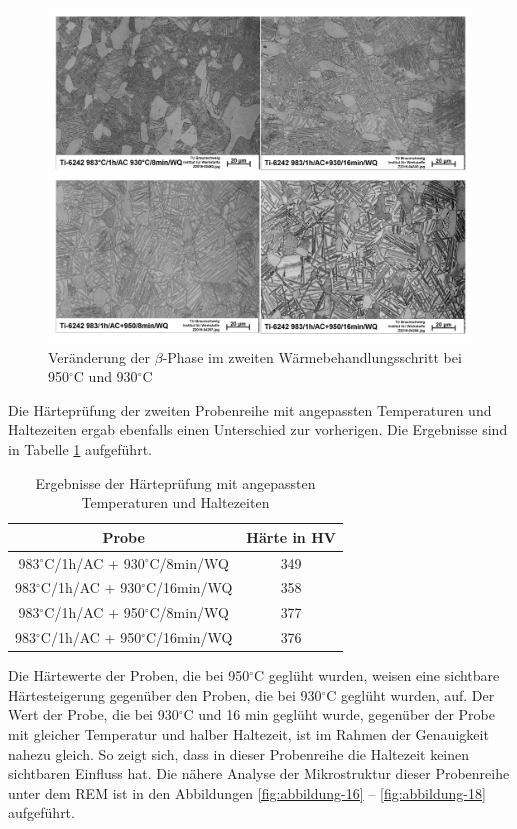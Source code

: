 \begin{figure}
	\centering
	\includegraphics[width=0.9\linewidth]{./Bilder/Abbildung 15.png}
	\caption[Abbildung 15]{Veränderung der $\beta$-Phase im zweiten Wärmebehandlungsschritt bei 950$^\circ$C und 930$^\circ$C}
	\label{fig:abbildung-15}
\end{figure}

Die Härteprüfung der zweiten Probenreihe mit angepassten Temperaturen und Haltezeiten ergab ebenfalls einen Unterschied zur vorherigen. Die Ergebnisse sind in Tabelle \ref{Tabelle 7} aufgeführt.

\begin{table}[h]
	\centering
	\begin{tabular}{|c|c|}
		\hline 
		Probe & Härte in HV \\ 
		\hline 
		983$^\circ$C/1h/AC + 930$^\circ$C/8min/WQ & 349 \\ 
		\hline 
		983$^\circ$C/1h/AC + 930$^\circ$C/16min/WQ & 358 \\ 
		\hline 
		983$^\circ$C/1h/AC + 950$^\circ$C/8min/WQ & 377 \\ 
		\hline 
		983$^\circ$C/1h/AC + 950$^\circ$C/16min/WQ & 376 \\ 
		\hline 
	\end{tabular} 
	\caption{Ergebnisse der Härteprüfung mit angepassten Temperaturen und Haltezeiten}
	\label{Tabelle 7}
\end{table}

Die Härtewerte der Proben, die bei 950$^\circ$C geglüht wurden, weisen eine sichtbare Härtesteigerung gegenüber den Proben, die bei 930$^\circ$C geglüht wurden, auf. Der Wert der Probe, die bei 930$^\circ$C und 16 min geglüht wurde, gegenüber der Probe mit gleicher Temperatur und halber Haltezeit, ist im Rahmen der Genauigkeit nahezu gleich. So zeigt sich, dass in dieser Probenreihe die Haltezeit keinen sichtbaren Einfluss hat. Die nähere Analyse der Mikrostruktur dieser Probenreihe unter dem REM ist in den Abbildungen \ref{fig:abbildung-16} -- \ref{fig:abbildung-18} aufgeführt.

